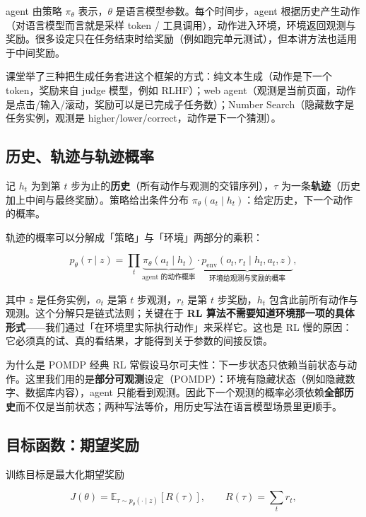 \documentclass[a4paper]{article}
\begin{document}
agent 由策略 $\pi_\theta$ 表示，$\theta$ 是语言模型参数。每个时间步，agent 根据历史产生动作（对语言模型而言就是采样 token / 工具调用），动作进入环境，环境返回观测与奖励。很多设定只在任务结束时给奖励（例如跑完单元测试），但本讲方法也适用于中间奖励。

课堂举了三种把生成任务套进这个框架的方式：纯文本生成（动作是下一个 token，奖励来自 judge 模型，例如 RLHF）；web agent（观测是当前页面，动作是点击/输入/滚动，奖励可以是已完成子任务数）；Number Search（隐藏数字是任务实例，观测是 higher/lower/correct，动作是下一个猜测）。

\subsection{历史、轨迹与轨迹概率}

记 $h_t$ 为到第 $t$ 步为止的\textbf{历史}（所有动作与观测的交错序列），$\tau$ 为一条\textbf{轨迹}（历史加上中间与最终奖励）。策略给出条件分布 $\pi_\theta(a_t \mid h_t)$：给定历史，下一个动作的概率。

轨迹的概率可以分解成「策略」与「环境」两部分的乘积：

$$
p_\theta(\tau \mid z) = \prod_{t} \underbrace{\pi_\theta(a_t \mid h_t)}_{\text{agent 的动作概率}} \cdot \underbrace{p_{\text{env}}(o_t, r_t \mid h_t, a_t, z)}_{\text{环境给观测与奖励的概率}},
$$

其中 $z$ 是任务实例，$o_t$ 是第 $t$ 步观测，$r_t$ 是第 $t$ 步奖励，$h_t$ 包含此前所有动作与观测。这个分解只是链式法则；关键在于 \textbf{RL 算法不需要知道环境那一项的具体形式}——我们通过「在环境里实际执行动作」来采样它。这也是 RL 慢的原因：它必须真的试、真的看结果，才能得到关于参数的间接反馈。

\begin{knowledgebox}{为什么是 POMDP}
经典 RL 常假设马尔可夫性：下一步状态只依赖当前状态与动作。这里我们用的是\textbf{部分可观测}设定（POMDP）：环境有隐藏状态（例如隐藏数字、数据库内容），agent 只能看到观测。因此下一个观测的概率必须依赖\textbf{全部历史}而不仅是当前状态；两种写法等价，用历史写法在语言模型场景里更顺手。
\end{knowledgebox}

\subsection{目标函数：期望奖励}

训练目标是最大化期望奖励

$$
J(\theta) = \mathbb{E}_{\tau \sim p_\theta(\cdot \mid z)}\left[R(\tau)\right], \qquad R(\tau) = \sum_{t} r_t,
$$
\end{document}
